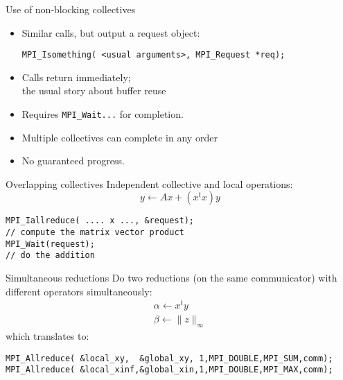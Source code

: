 \begin{numberedframe}{Use of non-blocking collectives}
  \label{sl:coll-nonblock-use}
  \begin{itemize}
  \item Similar calls, but output a request object:
\begin{lstlisting}
MPI_Isomething( <usual arguments>, MPI_Request *req);
\end{lstlisting}
  \item Calls return immediately;\\
    the usual story about buffer reuse
  \item Requires \lstinline{MPI_Wait}\texttt{...} for completion.
  \item Multiple collectives can complete in any order
  \item No guaranteed progress.
  \end{itemize}
\end{numberedframe}


\begin{numberedframe}{Overlapping collectives}
  \label{sl:coll-nonblock-overlap}
  Independent collective and local operations:
\[ y \leftarrow Ax + (x^tx)y \]
\begin{lstlisting}
MPI_Iallreduce( .... x ..., &request);
// compute the matrix vector product
MPI_Wait(request);
// do the addition
\end{lstlisting}
\end{numberedframe}

\begin{numberedframe}{Simultaneous reductions}
  \label{sl:coll-nonblock-simult}
  Do two reductions (on the same communicator) with different
  operators simultaneously:
  \[ 
  \begin{array}{l}
    \alpha\leftarrow x^ty\\
    \beta\leftarrow \|z\|_\infty
  \end{array}
  \]
which translates to:
\begin{lstlisting}
MPI_Allreduce( &local_xy,  &global_xy, 1,MPI_DOUBLE,MPI_SUM,comm);
MPI_Allreduce( &local_xinf,&global_xin,1,MPI_DOUBLE,MPI_MAX,comm);
\end{lstlisting}
\end{numberedframe}

\begin{exerciseframe}[procgridnonblock]
  \label{sl:coll-nonblock-exgrid}
  \hyperlink{ex:rowcolcomm}{}

  
\end{exerciseframe}

